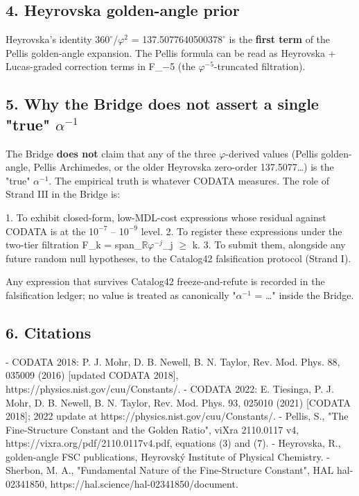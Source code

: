 \subsection{4. Heyrovska golden-angle prior}

Heyrovska's identity 36$0^{\circ}$/$\varphi^{2}$ = 137.507764050037$8^{\circ}$ is the \textbf{first term} of the Pellis golden-angle expansion. The Pellis formula can be read as Heyrovska + Lucas-graded correction terms in F\_{$-$5} (the $\varphi^{-5}$-truncated filtration).

\subsection{5. Why the Bridge does not assert a single "true" $\alpha^{-1}$}

The Bridge \textbf{does not} claim that any of the three $\varphi$-derived values (Pellis golden-angle, Pellis Archimedes, or the older Heyrovska zero-order 137.5077…) is the "true" $\alpha^{-1}$. The empirical truth is whatever CODATA measures. The role of Strand III in the Bridge is:

1. To exhibit closed-form, low-MDL-cost expressions whose residual against CODATA is at the 1$0^{-7}$ -- 1$0^{-9}$ level.
2. To register these expressions under the two-tier filtration F\_k = span\_$\mathbb{R}${$\varphi^{-j}$}\_{j $\geq$ k}.
3. To submit them, alongside any future random null hypotheses, to the Catalog42 falsification protocol (Strand I).

Any expression that survives Catalog42 freeze-and-refute is recorded in the falsification ledger; no value is treated as canonically "$\alpha^{-1}$ = …" inside the Bridge.

\subsection{6. Citations}

- CODATA 2018: P. J. Mohr, D. B. Newell, B. N. Taylor, Rev. Mod. Phys. 88, 035009 (2016) [updated CODATA 2018], https://physics.nist.gov/cuu/Constants/.
- CODATA 2022: E. Tiesinga, P. J. Mohr, D. B. Newell, B. N. Taylor, Rev. Mod. Phys. 93, 025010 (2021) [CODATA 2018]; 2022 update at https://physics.nist.gov/cuu/Constants/.
- Pellis, S., "The Fine-Structure Constant and the Golden Ratio", viXra 2110.0117 v4, https://vixra.org/pdf/2110.0117v4.pdf, equations (3) and (7).
- Heyrovska, R., golden-angle FSC publications, Heyrovský Institute of Physical Chemistry.
- Sherbon, M. A., "Fundamental Nature of the Fine-Structure Constant", HAL hal-02341850, https://hal.science/hal-02341850/document.
